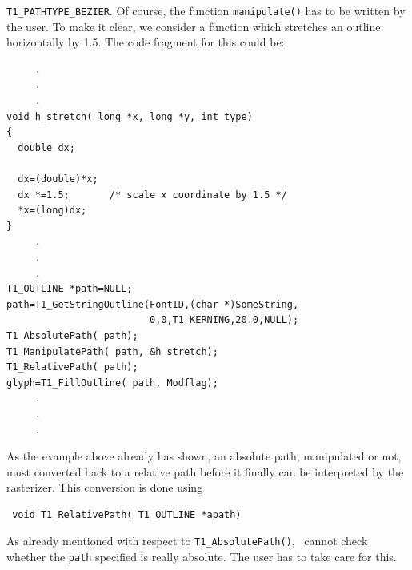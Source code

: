 \verb+T1_PATHTYPE_BEZIER+. Of course, the function \verb+manipulate()+ has to
be written by the user. To make it clear, we consider a function which
stretches an outline horizontally by 1.5. The code fragment for this could be:
\begin{verbatim}
     .
     .
     .
void h_stretch( long *x, long *y, int type)
{
  double dx;

  dx=(double)*x;
  dx *=1.5;       /* scale x coordinate by 1.5 */
  *x=(long)dx;
}
     .
     .
     .
T1_OUTLINE *path=NULL;
path=T1_GetStringOutline(FontID,(char *)SomeString,
                         0,0,T1_KERNING,20.0,NULL);
T1_AbsolutePath( path);
T1_ManipulatePath( path, &h_stretch);
T1_RelativePath( path);
glyph=T1_FillOutline( path, Modflag);
     .
     .
     .
\end{verbatim}

As the example above already has shown, an absolute path, manipulated or not,
must converted back to a relative path before it finally can be interpreted by
the rasterizer. This conversion is done using
\precorr
\begin{verbatim}
 void T1_RelativePath( T1_OUTLINE *apath)
\end{verbatim}\postcorr
As already mentioned with respect to \verb+T1_AbsolutePath()+, \tonelib\ cannot
check whether the \verb+path+ specified is really absolute. The user has to 
take care for this.

